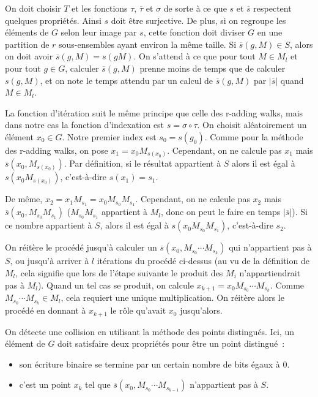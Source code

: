 		On doit choisir $T$ et les fonctions $\tau$, $\overline{\tau}$ et $\sigma$ de sorte à ce que $s$ et $\overline{s}$ respectent quelques propriétés. Ainsi $s$ doit être surjective. De plus, si on regroupe les éléments de $G$ selon leur image par $s$, cette fonction doit diviser $G$ en une partition de $r$ sous-ensembles ayant environ la même taille. Si $\overline{s}(g,M) \in S$, alors on doit avoir $\overline{s}(g,M) = s(g M)$. On s'attend à ce que pour tout $M \in M_l$ et pour tout $g \in G$, calculer $\overline{s}(g,M)$ prenne moins de temps que de calculer $s(g,M)$, et on note le temps attendu par un calcul de $\overline{s}(g,M)$ par $|\overline{s}|$ quand $M \in M_l$.
		
		La fonction d'itération suit le même principe que celle des r-adding walks, mais dans notre cas la fonction d'indexation est $s = \sigma \circ \tau$. On choisit aléatoirement un élément $x_0 \in G$. Notre premier index est $s_0 = s(g_0)$. Comme pour la méthode des r-adding walks, on pose $x_1 = x_0 M_{s(x_0)}$. Cependant, on ne calcule pas $x_1$ mais $\overline{s}(x_0,M_{s(x_0)})$. Par définition, si le résultat appartient à $S$ alors il est égal à $s(x_0 M_{s(x_0)})$, c'est-à-dire $s(x_1) = s_1$. 
		
		De même, $x_2 = x_1 M_{s_1} = x_0 M_{s_0} M_{s_1}$. Cependant, on ne calcule pas $x_2$ mais $\overline{s}(x_0,M_{s_0} M_{s_1})$ ($M_{s_0} M_{s_1}$ appartient à $M_l$, donc on peut le faire en temps $|\overline{s}|$). Si ce nombre appartient à $S$, alors il est égal à $s(x_0 M_{s_0} M_{s_1})$, c'est-à-dire $s_2$.
		
		On réitère le procédé jusqu'à calculer un $\overline{s}(x_0,M_{s_0} \cdots M_{s_k})$ qui n'appartient pas à $S$, ou jusqu'à arriver à $l$ itérations du procédé ci-dessus (au vu de la définition de $M_l$, cela signifie que lors de l'étape suivante le produit des $M_i$ n'appartiendrait pas à $M_l$). Quand un tel cas se produit, on calcule $x_{k+1} = x_0 M_{s_0} \cdots M_{s_k}$. Comme $M_{s_0} \cdots M_{s_k} \in M_l$, cela requiert une unique multiplication. On réitère alors le procédé en donnant à $x_{k+1}$ le rôle qu'avait $x_0$ jusqu'alors.
		
		On détecte une collision en utilisant la méthode des points distingués. Ici, un élément de $G$ doit satisfaire deux propriétés pour être un point distingué~:
		
		\begin{itemize}
		\item son écriture binaire se termine par un certain nombre de bits égaux à $0$.
		\item c'est un point $x_k$ tel que $\overline{s}(x_0,M_{s_0} \cdots M_{s_{k-1}})$ n'appartient pas à $S$.
		\end{itemize}
		
